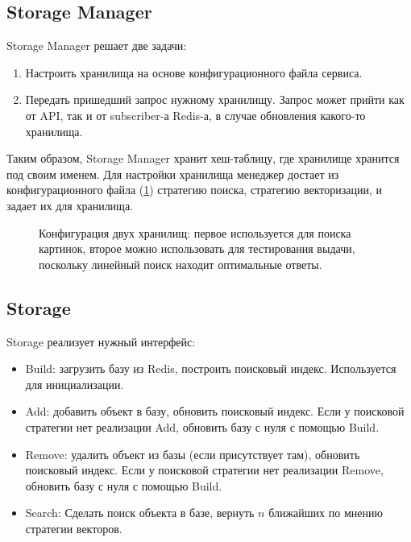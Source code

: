 \documentclass[a4paper,12pt]{extarticle}
\begin{document}
\subsection{Storage Manager}

Storage Manager решает две задачи:

\begin{enumerate}
    \item Настроить хранилища на основе конфигурационного файла сервиса.
    \item Передать пришедший запрос нужному хранилищу. Запрос может прийти как от API, так и от subscriber-а Redis-а, в случае обновления какого-то хранилища.
\end{enumerate}

Таким образом, Storage Manager хранит хеш-таблицу, где хранилище хранится под своим именем. Для настройки хранилища менеджер достает из конфигурационного файла (\cref{ris:storages_configs}) стратегию поиска, стратегию векторизации, и задает их для хранилища.


\begin{center}
\begin{figure}[H]
\caption{Конфигурация двух хранилищ: первое используется для поиска картинок, второе можно использовать для тестирования выдачи, поскольку линейный поиск находит оптимальные ответы.}
\label{ris:storages_configs}
\end{figure}
\end{center}


\subsection{Storage}

Storage реализует нужный интерфейс:

\begin{itemize}
\item Build: загрузить базу из Redis, построить поисковый индекс. Используется для инициализации.
\item Add: добавить объект в базу, обновить поисковый индекс. Если у поисковой стратегии нет реализации Add, обновить базу с нуля с помощью Build.
\item Remove: удалить объект из базы (если присутствует там), обновить поисковый индекс. Если у поисковой стратегии нет реализации Remove, обновить базу с нуля с помощью Build.
\item Search: Сделать поиск объекта в базе, вернуть $n$ ближайших по мнению стратегии векторов.
\end{itemize}
\end{document}
